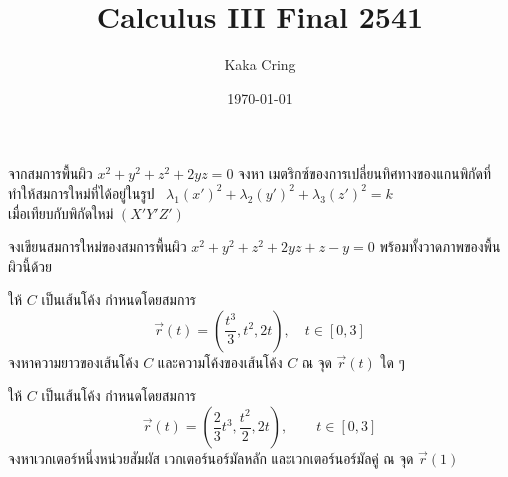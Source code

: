 \documentclass[12pt,final]{novelette} %
\title{Calculus III Final 2541}
\author{Kaka Cring}
\date{\today}
\begin{document}

\bigskip

\begin{question}
    \item {}
    \begin{question}
        \item
        จากสมการพื้นผิว $x^2 + y^2 + z^2 + 2yz = 0$
        จงหา เมตริกซ์ของการเปลี่ยนทิศทางของแกนพิกัดที่ทำให้สมการใหม่ที่ได้อยู่ในรูป \
        $\lambda_1(x')^2 + \lambda_2(y')^2 + \lambda_3(z')^2 = k$ \\
        เมื่อเทียบกับพิกัดใหม่ $(X'Y'Z')$



        \item
        จงเขียนสมการใหม่ของสมการพื้นผิว $x^2 + y^2 + z^2 + 2yz + z - y = 0$
        พร้อมทั้งวาดภาพของพื้นผิวนี้ด้วย \qmark{14}


    \end{question}

    \item {}
    \begin{question}
        \item
        ให้ $C$ เป็นเส้นโค้ง กำหนดโดยสมการ
        $$
            \vec{r}(t) = \left(\frac{t^3}{3}, t^2, 2t\right), \quad t \in [0, 3]
        $$
        จงหาความยาวของเส้นโค้ง $C$ และความโค้งของเส้นโค้ง $C$ ณ จุด $\vec{r}(t)$ ใด ๆ 



        \item
        ให้ $C$ เป็นเส้นโค้ง กำหนดโดยสมการ
        $$
            \vec{r}(t) = \left(\frac23 t^3, \frac{t^2}{2}, 2t\right), \qquad t \in [0, 3]
        $$
        จงหาเวกเตอร์หนึ่งหน่วยสัมผัส เวกเตอร์นอร์มัลหลัก และเวกเตอร์นอร์มัลคู่ ณ จุด $\vec{r}(1)$ 


    \end{question}


\end{question}
\end{document}
